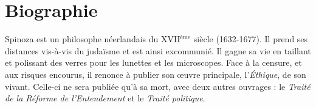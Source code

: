 \chapter{Biographie}
Spinoza est un philosophe néerlandais du {\footnotesize XVII$^\text{ème}$} siècle (1632-1677). Il prend ses distances vis-à-vis du judaïsme et est ainsi excommunié. Il gagne sa vie en taillant et polissant des verres pour les lunettes et les microscopes. Face à la censure, et aux risques encourus, il renonce à publier son œuvre principale, l’{\it Éthique}, de son vivant. Celle-ci ne sera publiée qu’à sa mort, avec deux autres ouvrages : le {\it Traité de la Réforme de l’Entendement} et le {\it Traité politique}.

